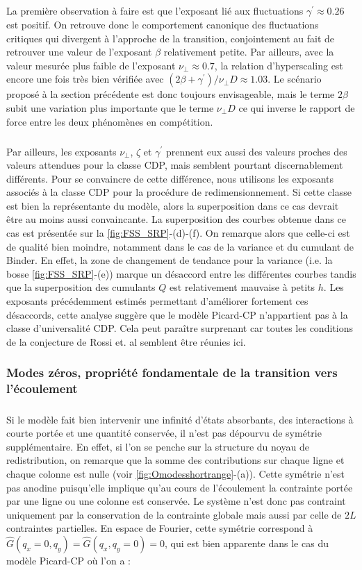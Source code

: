 \subparagraph{} La première observation à faire est que l'exposant lié aux fluctuations $\gamma^\prime \approx 0.26$ est positif. On retrouve donc le comportement canonique des fluctuations critiques qui divergent à l'approche de la transition, conjointement au fait de retrouver une valeur de l'exposant $\beta$ relativement petite. Par ailleurs, avec la valeur mesurée plus faible de l'exposant $\nu_\perp \approx 0.7$, la relation d'hyperscaling est encore une fois très bien vérifiée avec $(2\beta + \gamma^\prime)/\nu_\perp D \approx 1.03$. Le scénario proposé à la section précédente est donc toujours envisageable, mais le terme $2\beta$ subit une variation plus importante que le terme $\nu_\perp D$ ce qui inverse le rapport de force entre les deux phénomènes en compétition.

\subparagraph{}Par ailleurs, les exposants $\nu_\perp$, $\zeta$ et $\gamma^\prime$ prennent eux aussi des valeurs proches des valeurs attendues pour la classe CDP, mais semblent pourtant discernablement différents. Pour se convaincre de cette différence, nous utilisons les exposants associés à la classe CDP pour la procédure de redimensionnement. Si cette classe est bien la représentante du modèle, alors la superposition dans ce cas devrait être au moins aussi convaincante. La superposition des courbes obtenue dans ce cas est présentée sur la \autoref{fig:FSS_SRP}-(d)-(f). On remarque alors que celle-ci est de qualité bien moindre, notamment dans le cas de la variance et du cumulant de Binder. En effet, la zone de changement de tendance pour la variance (i.e. la bosse \autoref{fig:FSS_SRP}-(e)) marque un désaccord entre les différentes courbes tandis que la superposition des cumulants $Q$ est relativement mauvaise à petits $h$. Les exposants précédemment estimés permettant d'améliorer fortement ces désaccords, cette analyse suggère que le modèle Picard-CP n'appartient pas à la classe d'universalité CDP. Cela peut paraître surprenant car toutes les conditions de la conjecture de Rossi et. al \cite{rossi_universality_2000} semblent être réunies ici.

\subsubsection{Modes zéros, propriété fondamentale de la transition vers l'écoulement}

\subparagraph{}Si le modèle fait bien intervenir une infinité d'états absorbants, des interactions à courte portée et une quantité conservée, il n'est pas dépourvu de symétrie supplémentaire. En effet, si l'on se penche sur la structure du noyau de redistribution, on remarque que la somme des contributions sur chaque ligne et chaque colonne est nulle (voir \autoref{fig:Omodesshortrange}-(a)). Cette symétrie n'est pas anodine puisqu'elle implique qu'au cours de l'écoulement la contrainte portée par une ligne ou une colonne est conservée. Le système n'est donc pas contraint uniquement par la conservation de la contrainte globale mais aussi par celle de $2L$ contraintes partielles. En espace de Fourier, cette symétrie correspond à $\hat{G}(q_x=0,q_y)=\hat{G}(q_x,q_y=0)=0$, qui est bien apparente dans le cas du modèle Picard-CP où l'on a :

